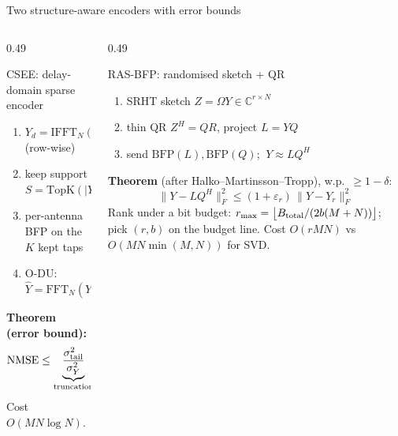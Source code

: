 \documentclass[aspectratio=169,10pt,xcolor={table,dvipsnames}]{beamer}
\begin{document}
\begin{frame}{Two structure-aware encoders with error bounds}
\begin{columns}[T]
\begin{column}{0.49\textwidth}
\begin{block}{CSEE: delay-domain sparse encoder}
\small
\begin{enumerate}
  \item $Y_d = \mathrm{IFFT}_N(Y)$ (row-wise)
  \item keep support $S = \mathrm{TopK}(|Y_d|)$
  \item per-antenna BFP on the $K$ kept taps
  \item O-DU: $\hat Y = \mathrm{FFT}_N(Y_d|_S)$
\end{enumerate}
\textbf{Theorem (error bound):}
\[ \mathrm{NMSE} \le \underbrace{\frac{\sigma^2_{\rm tail}}{\sigma^2_Y}}_{\text{truncation}} + \underbrace{\frac{\Delta^2}{12}\frac{K}{MN\sigma_Y^2}}_{\text{quantisation}} \]
Cost $O(MN\log N)$.
\end{block}
\end{column}
\begin{column}{0.49\textwidth}
\begin{block}{RAS-BFP: randomised sketch + QR}
\small
\begin{enumerate}
  \item SRHT sketch $Z = \Omega Y \in \mathbb{C}^{r\times N}$
  \item thin QR $Z^H = QR$, project $L = YQ$
  \item send $\mathrm{BFP}(L), \mathrm{BFP}(Q)$; $\ Y \approx LQ^H$
\end{enumerate}
\textbf{Theorem} (after Halko--Martinsson--Tropp), w.p.\ $\ge 1-\delta$:
\[ \|Y - LQ^H\|_F^2 \le (1+\varepsilon_r)\,\|Y - Y_r\|_F^2 \]
Rank under a bit budget: $r_{\max} = \big\lfloor B_{\rm total}/(2b(M+N))\big\rfloor$; pick $(r,b)$ on the budget line. Cost $O(rMN)$ vs $O(MN\min(M,N))$ for SVD.
\end{block}
\end{column}
\end{columns}
\end{frame}
\end{document}
